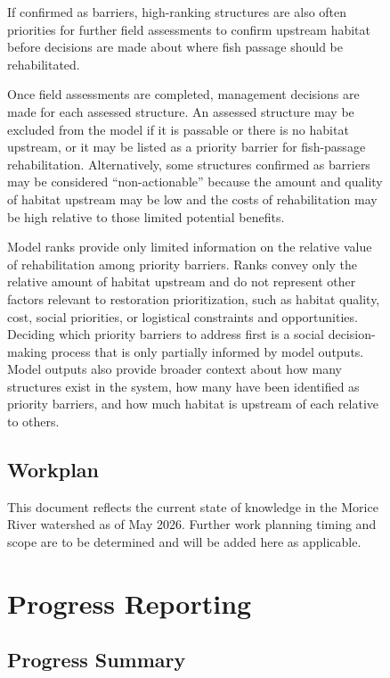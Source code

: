 \documentclass[
  letterpaper,
  DIV=11,
  numbers=noendperiod]{scrreprt}
\begin{document}
\begin{figure}
{If confirmed as barriers, high-ranking structures are also often
priorities for further field assessments to confirm upstream habitat
before decisions are made about where fish passage should be
rehabilitated.

Once field assessments are completed, management decisions are made for
each assessed structure. An assessed structure may be excluded from the
model if it is passable or there is no habitat upstream, or it may be
listed as a priority barrier for fish-passage rehabilitation.
Alternatively, some structures confirmed as barriers may be considered
``non-actionable'' because the amount and quality of habitat upstream
may be low and the costs of rehabilitation may be high relative to those
limited potential benefits.

Model ranks provide only limited information on the relative value of
rehabilitation among priority barriers. Ranks convey only the relative
amount of habitat upstream and do not represent other factors relevant
to restoration prioritization, such as habitat quality, cost, social
priorities, or logistical constraints and opportunities. Deciding which
priority barriers to address first is a social decision-making process
that is only partially informed by model outputs. Model outputs also
provide broader context about how many structures exist in the system,
how many have been identified as priority barriers, and how much habitat
is upstream of each relative to others.

\section*{Workplan}\label{workplan}


This document reflects the current state of knowledge in the Morice
River watershed as of May 2026. Further work planning timing and scope
are to be determined and will be added here as applicable.


\chapter*{Progress Reporting}\label{progress-reporting}


\section*{Progress Summary}\label{progress-summary}

}
\end{figure}
\end{document}
